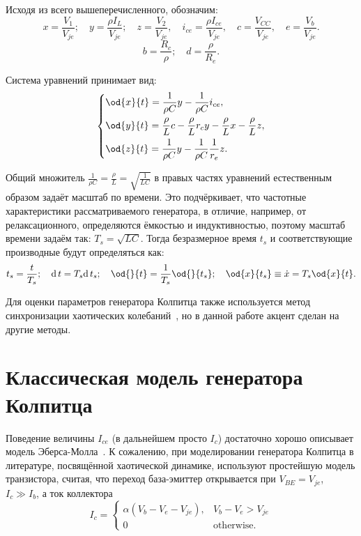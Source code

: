 Исходя из всего вышеперечисленного, обозначим:
%
\[
  x = \frac{V_{1}}{V_{je}} ; \quad
  y = \frac{\rho I_L}{V_{je}} ; \quad
  z = \frac{V_{2}}{V_{je}}, \quad
  i_{ce} = \frac{\rho I_{ce}}{V_{je}}, \quad
  c = \frac{V_{CC}}{V_{je}}, \quad
  e = \frac{V_{b}}{V_{je}}.
\]
%
\[
  b = \frac{R_c}{\rho}; \quad
  d = \frac{\rho}{R_e}. %
\]

Система уравнений принимает вид:
%
\begin{equation}
\label{atu:eq:colp_phys2}
\begin{dcases}
  \od{x}{t}  = \dfrac{1}{\rho C}  y - \dfrac{1}{\rho C} i_{ce} , \\
  \od{y}{t}  = \dfrac{\rho}{L} c    - \dfrac{\rho}{L} r_c y - \dfrac{\rho}{L} x- \dfrac{\rho}{L} z, \\
  \od{z}{t}  = \dfrac{1}{\rho C}  y - \dfrac{1}{\rho C} \dfrac{1}{r_e} z.
\end{dcases}
\end{equation}

Общий множитель $ \frac{1}{\rho C} = \frac{\rho}{L} = \sqrt{\frac{1}{LC}} $ в правых частях уравнений
естественным образом задаёт масштаб по времени.
Это подчёркивает, что частотные характеристики рассматриваемого генератора,
в отличие, например, от релаксационного,
определяются ёмкостью и индуктивностью,
поэтому масштаб времени задаём так:
$ T_s = \sqrt{L C} $.
Тогда безразмерное время $t_s$
и соответствующие производные
будут определяться как:
%
\[
  t_s = \frac{t}{T_s}; \quad
  \mathrm{d}\, t = T_s \mathrm{d}\, t_s; \quad
  \od{}{t}  = \frac{1}{T_s} \od{}{t_s}; \quad
  \od{x}{t_s} \equiv \dot{x} = T_s \od{x}{t} .
\]

Для оценки параметров генератора Колпитца также используется
метод синхронизации хаотических колебаний~\cite{PhysRevE.80.016201,picovskii_syncro,bonetti_super_persistent_colpitts},
но в данной работе акцент сделан на другие методы.


\section{Классическая модель генератора Колпитца}  %

Поведение величины $I_{ce}$ (в дальнейшем просто $I_c$) достаточно хорошо описывает модель
Эберса-Молла~\cite{horowitz}.
К сожалению, при моделировании генератора Колпитца в литературе,
посвящённой хаотической динамике, используют
простейшую модель транзистора, считая, что переход
база-эмиттер открывается при $V_{BE} = V_{je}$, $ I_c \gg I_b$,
а ток коллектора
%
\begin{equation}
I_c =
  \begin{cases}
    \alpha ( V_b - V_e - V_{je} ), & V_b - V_e > V_{je} \\
    0                              & \text{otherwise}.
  \end{cases}
  \label{atu:eq:bjt_libear_model}
\end{equation}


